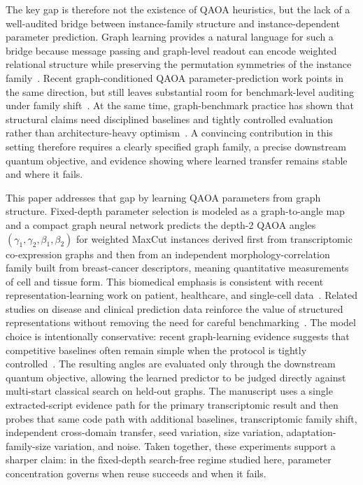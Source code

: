 \documentclass[
  reprint,
  twocolumn,
  aps,
  superscriptaddress,
  longbibliography,
  floatfix
]{revtex4-2}
\begin{document}
The key gap is therefore not the existence of QAOA heuristics, but the lack of a well-audited bridge between instance-family structure and instance-dependent parameter prediction. Graph learning provides a natural language for such a bridge because message passing and graph-level readout can encode weighted relational structure while preserving the permutation symmetries of the instance family~\cite{hamilton2017,gilmer2017}. Recent graph-conditioned QAOA parameter-prediction work points in the same direction, but still leaves substantial room for benchmark-level auditing under family shift~\cite{liang2024graph}. At the same time, graph-benchmark practice has shown that structural claims need disciplined baselines and tightly controlled evaluation rather than architecture-heavy optimism~\cite{dwivedi2020,you2020design}. A convincing contribution in this setting therefore requires a clearly specified graph family, a precise downstream quantum objective, and evidence showing where learned transfer remains stable and where it fails.

This paper addresses that gap by learning QAOA parameters from graph structure. Fixed-depth parameter selection is modeled as a graph-to-angle map and a compact graph neural network predicts the depth-2 QAOA angles $(\gamma_1,\gamma_2,\beta_1,\beta_2)$ for weighted MaxCut instances derived first from transcriptomic co-expression graphs and then from an independent morphology-correlation family built from breast-cancer descriptors, meaning quantitative measurements of cell and tissue form. This biomedical emphasis is consistent with recent representation-learning work on patient, healthcare, and single-cell data~\cite{miotto2016,choi2017gram,wang2021scgnn}. Related studies on disease and clinical prediction data reinforce the value of structured representations without removing the need for careful benchmarking~\cite{parisot2018,rajkomar2018,caruana2015}. The model choice is intentionally conservative: recent graph-learning evidence suggests that competitive baselines often remain simple when the protocol is tightly controlled~\cite{chen2020sgc,corso2020}. The resulting angles are evaluated only through the downstream quantum objective, allowing the learned predictor to be judged directly against multi-start classical search on held-out graphs. The manuscript uses a single extracted-script evidence path for the primary transcriptomic result and then probes that same code path with additional baselines, transcriptomic family shift, independent cross-domain transfer, seed variation, size variation, adaptation-family-size variation, and noise. Taken together, these experiments support a sharper claim: in the fixed-depth search-free regime studied here, parameter concentration governs when reuse succeeds and when it fails.
\end{document}
